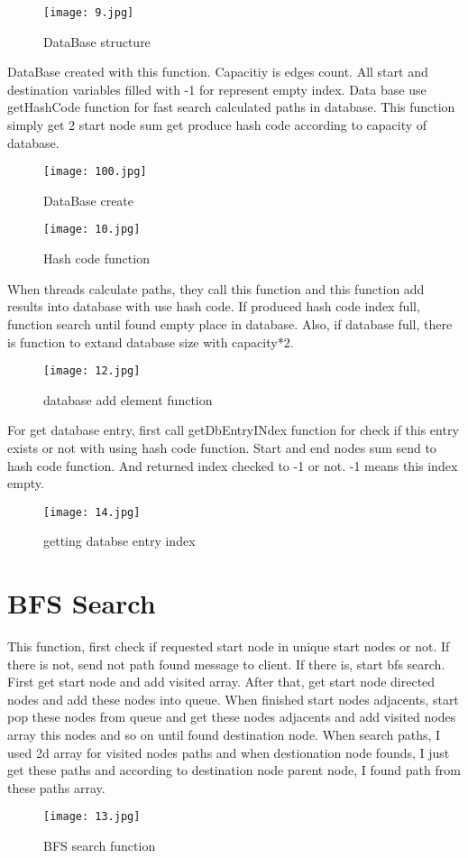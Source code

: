 \documentclass{article}
\begin{document}
\begin{figure}[h!] 
    \centering
    \texttt{[image: 9.jpg]}
    \caption{DataBase structure}
\end{figure}

DataBase created with this function. Capacitiy is edges count. All start and destination variables filled with -1 for represent empty index. Data base use getHashCode function for fast search calculated paths in database. This function simply get 2 start node sum get produce hash code according to capacity of database.
\begin{figure}[h!] 
    \centering
    \texttt{[image: 100.jpg]}
    \caption{DataBase create}
\end{figure}

\begin{figure}[h!] 
    \centering
    \texttt{[image: 10.jpg]}
    \caption{Hash code function}
\end{figure}
\newpage
When threads calculate paths, they call this function and this function add results into database with use hash code. If produced hash code index full, function search until found empty place in database. Also, if database full, there is function to extand database size with capacity*2.
\begin{figure}[h!] 
    \centering
    \texttt{[image: 12.jpg]}
    \caption{database add element function}
\end{figure}

For get database entry, first call getDbEntryINdex function for check if this entry exists or not with using hash code function.  Start and end nodes sum send to hash code function. And returned index checked to -1 or not. -1 means this index empty. 
\begin{figure}[h!] 
    \centering
    \texttt{[image: 14.jpg]}
    \caption{getting databse entry index}
\end{figure}

\newpage
\section{BFS Search}
This function, first check if requested start node in unique start nodes or not. If there is not, send not path found message to client. If there is, start bfs search. First get start node and add visited array. After that, get start node directed nodes and add these nodes into queue. When finished start nodes adjacents, start pop these nodes from queue and get these nodes adjacents and add visited nodes array this nodes and so on until found destination node. When search paths, I used 2d array for visited nodes paths and when destionation node founds, I just get these paths and according to destination node parent node, I found path from these paths array. 
\begin{figure}[h!] 
    \centering
    \texttt{[image: 13.jpg]}
    \caption{BFS search function}
\end{figure}
\end{document}
